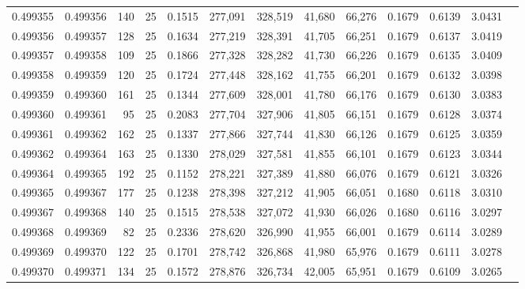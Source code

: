 \begin{tabular}{rrrrrrrrrrrrr}
0.499355 & 0.499356 & 140 &  25 &                                     0.1515 & 277,091 & 328,519 &  41,680 &  66,276 & 0.1679 & 0.6139 & 3.0431 \\
0.499356 & 0.499357 & 128 &  25 &                                     0.1634 & 277,219 & 328,391 &  41,705 &  66,251 & 0.1679 & 0.6137 & 3.0419 \\
0.499357 & 0.499358 & 109 &  25 &                                     0.1866 & 277,328 & 328,282 &  41,730 &  66,226 & 0.1679 & 0.6135 & 3.0409 \\
0.499358 & 0.499359 & 120 &  25 &                                     0.1724 & 277,448 & 328,162 &  41,755 &  66,201 & 0.1679 & 0.6132 & 3.0398 \\
0.499359 & 0.499360 & 161 &  25 &                                     0.1344 & 277,609 & 328,001 &  41,780 &  66,176 & 0.1679 & 0.6130 & 3.0383 \\
0.499360 & 0.499361 &  95 &  25 &                                     0.2083 & 277,704 & 327,906 &  41,805 &  66,151 & 0.1679 & 0.6128 & 3.0374 \\
0.499361 & 0.499362 & 162 &  25 &                                     0.1337 & 277,866 & 327,744 &  41,830 &  66,126 & 0.1679 & 0.6125 & 3.0359 \\
0.499362 & 0.499364 & 163 &  25 &                                     0.1330 & 278,029 & 327,581 &  41,855 &  66,101 & 0.1679 & 0.6123 & 3.0344 \\
0.499364 & 0.499365 & 192 &  25 &                                     0.1152 & 278,221 & 327,389 &  41,880 &  66,076 & 0.1679 & 0.6121 & 3.0326 \\
0.499365 & 0.499367 & 177 &  25 &                                     0.1238 & 278,398 & 327,212 &  41,905 &  66,051 & 0.1680 & 0.6118 & 3.0310 \\
0.499367 & 0.499368 & 140 &  25 &                                     0.1515 & 278,538 & 327,072 &  41,930 &  66,026 & 0.1680 & 0.6116 & 3.0297 \\
0.499368 & 0.499369 &  82 &  25 &                                     0.2336 & 278,620 & 326,990 &  41,955 &  66,001 & 0.1679 & 0.6114 & 3.0289 \\
0.499369 & 0.499370 & 122 &  25 &                                     0.1701 & 278,742 & 326,868 &  41,980 &  65,976 & 0.1679 & 0.6111 & 3.0278 \\
0.499370 & 0.499371 & 134 &  25 &                                     0.1572 & 278,876 & 326,734 &  42,005 &  65,951 & 0.1679 & 0.6109 & 3.0265 \\

\end{tabular}
